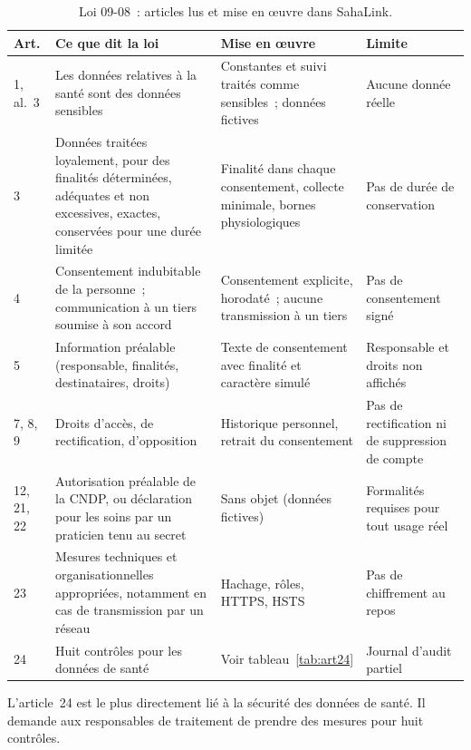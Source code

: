 \begin{table}[H]
\centering
\caption{Loi 09-08~: articles lus et mise en œuvre dans SahaLink.}
\label{tab:loi0908}
\scriptsize
\begin{tabularx}{\textwidth}{@{}l X X X@{}}
\toprule
\textbf{Art.} & \textbf{Ce que dit la loi} & \textbf{Mise en œuvre} & \textbf{Limite} \\
\midrule
1, al.~3 & Les données relatives à la santé sont des données sensibles & Constantes et suivi traités comme sensibles~; données fictives & Aucune donnée réelle \\
3 & Données traitées loyalement, pour des finalités déterminées, adéquates et non excessives, exactes, conservées pour une durée limitée & Finalité dans chaque consentement, collecte minimale, bornes physiologiques & Pas de durée de conservation \\
4 & Consentement indubitable de la personne~; communication à un tiers soumise à son accord & Consentement explicite, horodaté~; aucune transmission à un tiers & Pas de consentement signé \\
5 & Information préalable (responsable, finalités, destinataires, droits) & Texte de consentement avec finalité et caractère simulé & Responsable et droits non affichés \\
7, 8, 9 & Droits d'accès, de rectification, d'opposition & Historique personnel, retrait du consentement & Pas de rectification ni de suppression de compte \\
12, 21, 22 & Autorisation préalable de la \ac{CNDP}, ou déclaration pour les soins par un praticien tenu au secret & Sans objet (données fictives) & Formalités requises pour tout usage réel \\
23 & Mesures techniques et organisationnelles appropriées, notamment en cas de transmission par un réseau & Hachage, rôles, \ac{HTTPS}, \ac{HSTS} & Pas de chiffrement au repos \\
24 & Huit contrôles pour les données de santé & Voir tableau~\ref{tab:art24} & Journal d'audit partiel \\
\bottomrule
\end{tabularx}
\end{table}

L'article~24 est le plus directement lié à la sécurité des données de santé. Il demande aux responsables de traitement de prendre des mesures pour huit contrôles.

